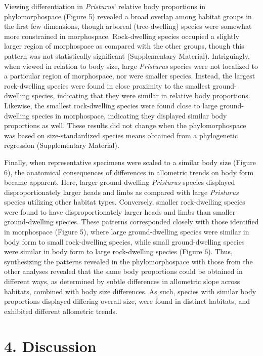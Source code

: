 \documentclass[
  11pt,
]{article}
\begin{document}
Viewing differentiation in \emph{Pristurus}' relative body proportions
in phylomorphospace (Figure 5) revealed a broad overlap among habitat
groups in the first few dimensions, though arboreal (tree-dwelling)
species were somewhat more constrained in morphospace. Rock-dwelling
species occupied a slightly larger region of morphospace as compared
with the other groups, though this pattern was not statistically
significant (Supplementary Material). Intriguingly, when viewed in
relation to body size, large \emph{Pristurus} species were not localized
to a particular region of morphospace, nor were smaller species.
Instead, the largest rock-dwelling species were found in close proximity
to the smallest ground-dwelling species, indicating that they were
similar in relative body proportions. Likewise, the smallest
rock-dwelling species were found close to large ground-dwelling species
in morphospace, indicating they displayed similar body proportions as
well. These results did not change when the phylomorphospace was based
on size-standardized species means obtained from a phylogenetic
regression (Supplementary Material). \hfill\break

Finally, when representative specimens were scaled to a similar body
size (Figure 6), the anatomical consequences of differences in
allometric trends on body form became apparent. Here, larger
ground-dwelling \emph{Pristurus} species displayed disproportionately
larger heads and limbs as compared with large \emph{Pristurus} species
utilizing other habitat types. Conversely, smaller rock-dwelling species
were found to have disproportionately larger heads and limbs than
smaller ground-dwelling species. These patterns corresponded closely
with those identified in morphospace (Figure 5), where large
ground-dwelling species were similar in body form to small rock-dwelling
species, while small ground-dwelling species were similar in body form
to large rock-dwelling species (Figure 6). Thus, synthesizing the
patterns revealed in the phylomorphospace with those from the other
analyses revealed that the same body proportions could be obtained in
different ways, as determined by subtle differences in allometric slope
across habitats, combined with body size differences. As such, species
with similar body proportions displayed differing overall size, were
found in distinct habitats, and exhibited different allometric trends.
\hfill\break

\hypertarget{discussion}{%
\section{4. Discussion}\label{discussion}}
\end{document}
